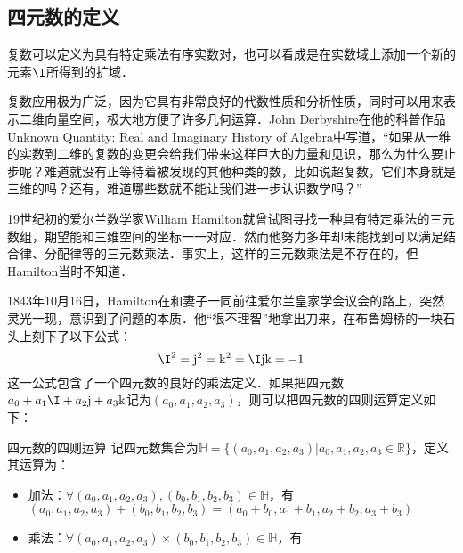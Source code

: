 

\subsection{四元数的定义}

复数可以定义为具有特定乘法有序实数对，也可以看成是在实数域上添加一个新的元素$\I$所得到的扩域．

复数应用极为广泛，因为它具有非常良好的代数性质和分析性质，同时可以用来表示二维向量空间，极大地方便了许多几何运算．John Derbyshire在他的科普作品Unknown Quantity: Real and Imaginary History of Algebra中写道，“如果从一维的实数到二维的复数的变更会给我们带来这样巨大的力量和见识，那么为什么要止步呢？难道就没有正等待着被发现的其他种类的数，比如说超复数，它们本身就是三维的吗？还有，难道哪些数就不能让我们进一步认识数学吗？”

19世纪初的爱尔兰数学家William Hamilton就曾试图寻找一种具有特定乘法的三元数组，期望能和三维空间的坐标一一对应．然而他努力多年却未能找到可以满足结合律、分配律等的三元数乘法．事实上，这样的三元数乘法是不存在的，但Hamilton当时不知道．

1843年10月16日，Hamilton在和妻子一同前往爱尔兰皇家学会议会的路上，突然灵光一现，意识到了问题的本质．他“很不理智”地拿出刀来，在布鲁姆桥的一块石头上刻下了以下公式：$$\I^2=\mathrm{j}^2=\mathrm{k}^2=\I\mathrm{j}\mathrm{k}=-1$$这一公式包含了一个四元数的良好的乘法定义．如果把四元数$a_0+a_1\I+a_2\mathrm{j}+a_3\mathrm{k}$记为$(a_0, a_1, a_2, a_3)$，则可以把四元数的四则运算定义如下：

\begin{definition}{四元数的四则运算}
记四元数集合为$\mathbb{H}=\{(a_0, a_1, a_2, a_3)|a_0, a_1, a_2, a_3\in\mathbb{R}\}$，定义其运算为：
\begin{itemize}

\item 加法：$\forall(a_0, a_1, a_2, a_3), (b_0, b_1, b_2, b_3)\in\mathbb{H}$，有$(a_0, a_1, a_2, a_3)+(b_0, b_1, b_2, b_3)=(a_0+b_0, a_1+b_1, a_2+b_2, a_3+b_3)$
\item 乘法：$\forall(a_0, a_1, a_2, a_3)\times(b_0, b_1, b_2, b_3)\in\mathbb{H}$，有

\end{itemize}



\end{definition}
